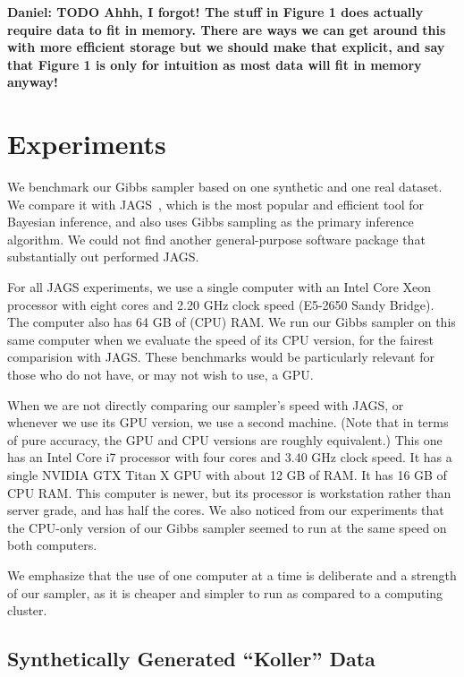 \documentclass{article} %
\begin{document}
\textbf{Daniel: TODO Ahhh, I forgot! The stuff in Figure 1 does actually require data to fit in
memory. There are ways we can get around this with more efficient storage but we should make that
explicit, and say that Figure 1 is only for intuition as most data will fit in memory anyway!}




\section{Experiments}\label{sec:experiments}

We benchmark our Gibbs sampler based on one synthetic and one real dataset. We compare it with
JAGS~\citep{JAGS2003}, which is the most popular and efficient tool for Bayesian inference, and also
uses Gibbs sampling as the primary inference algorithm. We could not find another general-purpose
software package that substantially out performed JAGS. %

For all JAGS experiments, we use a single computer with an Intel Core Xeon processor with eight
cores and 2.20 GHz clock speed (E5-2650 Sandy Bridge). The computer also has 64 GB of (CPU) RAM. We
run our Gibbs sampler on this same computer when we evaluate the speed of its CPU version, for the
fairest comparision with JAGS. These benchmarks would be particularly relevant for those who do not
have, or may not wish to use, a GPU.
    
When we are not directly comparing our sampler's speed with JAGS, or whenever we use its GPU
version, we use a second machine. (Note that in terms of pure accuracy, the GPU and CPU versions are
roughly equivalent.) This one has an Intel Core i7 processor with four cores and 3.40 GHz clock
speed. It has a single NVIDIA GTX Titan X GPU with about 12 GB of RAM. It has 16 GB of CPU RAM. This
computer is newer, but its processor is workstation rather than server grade, and has half the
cores. We also noticed from our experiments that the CPU-only version of our Gibbs sampler seemed to
run at the same speed on both computers.

We emphasize that the use of one computer at a time is deliberate and a strength of our sampler, as
it is cheaper and simpler to run as compared to a computing cluster.

\subsection{Synthetically Generated ``Koller'' Data}\label{ssec:koller_data}
\end{document}
